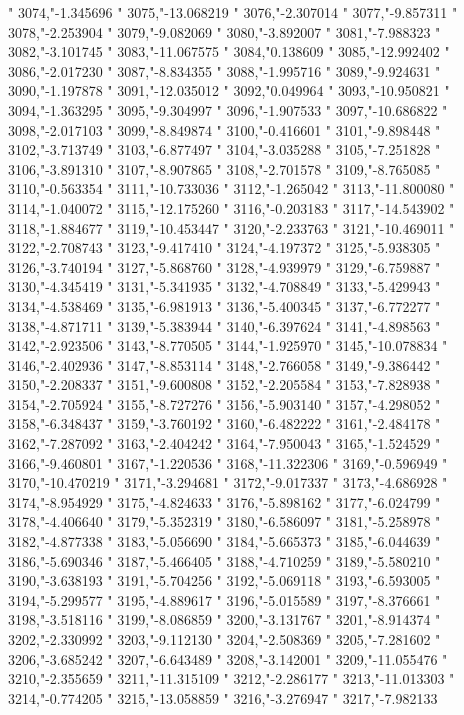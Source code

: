 "
3074,"-1.345696
"
3075,"-13.068219
"
3076,"-2.307014
"
3077,"-9.857311
"
3078,"-2.253904
"
3079,"-9.082069
"
3080,"-3.892007
"
3081,"-7.988323
"
3082,"-3.101745
"
3083,"-11.067575
"
3084,"0.138609
"
3085,"-12.992402
"
3086,"-2.017230
"
3087,"-8.834355
"
3088,"-1.995716
"
3089,"-9.924631
"
3090,"-1.197878
"
3091,"-12.035012
"
3092,"0.049964
"
3093,"-10.950821
"
3094,"-1.363295
"
3095,"-9.304997
"
3096,"-1.907533
"
3097,"-10.686822
"
3098,"-2.017103
"
3099,"-8.849874
"
3100,"-0.416601
"
3101,"-9.898448
"
3102,"-3.713749
"
3103,"-6.877497
"
3104,"-3.035288
"
3105,"-7.251828
"
3106,"-3.891310
"
3107,"-8.907865
"
3108,"-2.701578
"
3109,"-8.765085
"
3110,"-0.563354
"
3111,"-10.733036
"
3112,"-1.265042
"
3113,"-11.800080
"
3114,"-1.040072
"
3115,"-12.175260
"
3116,"-0.203183
"
3117,"-14.543902
"
3118,"-1.884677
"
3119,"-10.453447
"
3120,"-2.233763
"
3121,"-10.469011
"
3122,"-2.708743
"
3123,"-9.417410
"
3124,"-4.197372
"
3125,"-5.938305
"
3126,"-3.740194
"
3127,"-5.868760
"
3128,"-4.939979
"
3129,"-6.759887
"
3130,"-4.345419
"
3131,"-5.341935
"
3132,"-4.708849
"
3133,"-5.429943
"
3134,"-4.538469
"
3135,"-6.981913
"
3136,"-5.400345
"
3137,"-6.772277
"
3138,"-4.871711
"
3139,"-5.383944
"
3140,"-6.397624
"
3141,"-4.898563
"
3142,"-2.923506
"
3143,"-8.770505
"
3144,"-1.925970
"
3145,"-10.078834
"
3146,"-2.402936
"
3147,"-8.853114
"
3148,"-2.766058
"
3149,"-9.386442
"
3150,"-2.208337
"
3151,"-9.600808
"
3152,"-2.205584
"
3153,"-7.828938
"
3154,"-2.705924
"
3155,"-8.727276
"
3156,"-5.903140
"
3157,"-4.298052
"
3158,"-6.348437
"
3159,"-3.760192
"
3160,"-6.482222
"
3161,"-2.484178
"
3162,"-7.287092
"
3163,"-2.404242
"
3164,"-7.950043
"
3165,"-1.524529
"
3166,"-9.460801
"
3167,"-1.220536
"
3168,"-11.322306
"
3169,"-0.596949
"
3170,"-10.470219
"
3171,"-3.294681
"
3172,"-9.017337
"
3173,"-4.686928
"
3174,"-8.954929
"
3175,"-4.824633
"
3176,"-5.898162
"
3177,"-6.024799
"
3178,"-4.406640
"
3179,"-5.352319
"
3180,"-6.586097
"
3181,"-5.258978
"
3182,"-4.877338
"
3183,"-5.056690
"
3184,"-5.665373
"
3185,"-6.044639
"
3186,"-5.690346
"
3187,"-5.466405
"
3188,"-4.710259
"
3189,"-5.580210
"
3190,"-3.638193
"
3191,"-5.704256
"
3192,"-5.069118
"
3193,"-6.593005
"
3194,"-5.299577
"
3195,"-4.889617
"
3196,"-5.015589
"
3197,"-8.376661
"
3198,"-3.518116
"
3199,"-8.086859
"
3200,"-3.131767
"
3201,"-8.914374
"
3202,"-2.330992
"
3203,"-9.112130
"
3204,"-2.508369
"
3205,"-7.281602
"
3206,"-3.685242
"
3207,"-6.643489
"
3208,"-3.142001
"
3209,"-11.055476
"
3210,"-2.355659
"
3211,"-11.315109
"
3212,"-2.286177
"
3213,"-11.013303
"
3214,"-0.774205
"
3215,"-13.058859
"
3216,"-3.276947
"
3217,"-7.982133

